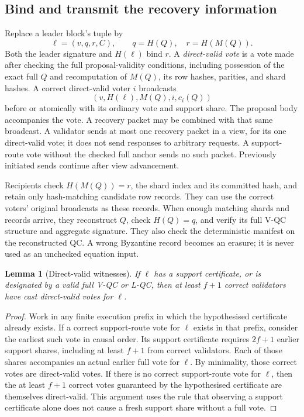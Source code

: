 \documentclass[11pt,a4paper]{article}
\newtheorem{lemma}[theorem]{Lemma}
\theoremstyle{definition}
\begin{document}
\subsection{Bind and transmit the recovery information}

Replace a leader block's tuple by
\[
  \ell=(v,q,r,C),\qquad q=H(Q),\quad r=H(M(Q)).
\]
Both the leader signature and \(H(\ell)\) bind \(r\). A \emph{direct-valid
vote} is a vote made after checking the full proposal-validity conditions,
including possession of the exact full \(Q\) and recomputation of
\(M(Q)\), its row hashes, parities, and shard hashes. A correct direct-valid
voter \(i\) broadcasts
\begin{equation}
  (v,H(\ell),M(Q),i,c_i(Q))
  \label{eq:repair}
\end{equation}
before or atomically with its ordinary vote and support share. The proposal
body accompanies the vote. A recovery packet may be combined with that
same broadcast. A validator sends at most one recovery packet in a view,
for its one direct-valid vote; it does not send responses to arbitrary
requests. A support-route vote without the checked full anchor sends no
such packet. Previously initiated sends continue after view advancement.

Recipients check \(H(M(Q))=r\), the shard index and its committed hash,
and retain only hash-matching candidate row records. They can use the
correct voters' original broadcasts as these records. When enough matching
shards and records arrive, they reconstruct \(Q\), check \(H(Q)=q\), and
verify its full V-QC structure and aggregate signature. They also check the
deterministic manifest on the reconstructed QC. A wrong Byzantine record
becomes an erasure; it is never used as an unchecked equation input.

\begin{lemma}[Direct-valid witnesses]\label{lem:witness}
If \(\ell\) has a support certificate, or is designated by a valid full
V-QC or L-QC, then at least \(f+1\) correct validators have cast
direct-valid votes for \(\ell\).
\end{lemma}
\begin{proof}
Work in any finite execution prefix in which the hypothesised certificate
already exists. If a correct support-route vote for \(\ell\) exists in
that prefix, consider the earliest
such vote in causal order. Its support certificate requires \(2f+1\)
earlier support shares, including at least \(f+1\) from correct validators.
Each of those shares accompanies an actual earlier full vote for \(\ell\).
By minimality, those correct votes are direct-valid votes. If there is no
correct support-route vote for \(\ell\), then the at least \(f+1\) correct
votes guaranteed by the hypothesised certificate are themselves
direct-valid. This argument uses the rule that observing a support
certificate alone does not cause a fresh support share without a full vote.
\end{proof}
\end{document}
